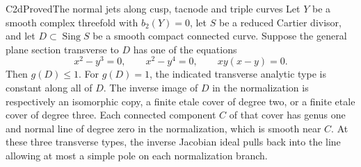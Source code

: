 \begin{statement}{C2d}{Proved}{The normal jets along cusp, tacnode and triple curves}
Let $Y$ be a smooth complex threefold with $b_2(Y)=0$, let $S$ be a reduced Cartier divisor, and let $D\subset\operatorname{Sing}S$ be a smooth compact connected curve. Suppose the general plane section transverse to $D$ has one of the equations
\[
 x^2-y^3=0,\qquad x^2-y^4=0,\qquad xy(x-y)=0.
 \tag{C.J.1}
\]
Then $g(D)\le1$. For $g(D)=1$, the indicated transverse analytic type is constant along all of $D$. The inverse image of $D$ in the normalization is respectively an isomorphic copy, a finite etale cover of degree two, or a finite etale cover of degree three. Each connected component $C$ of that cover has genus one and normal line of degree zero in the normalization, which is smooth near $C$. At these three transverse types, the inverse Jacobian ideal pulls back into the line allowing at most a simple pole on each normalization branch.
\end{statement}

